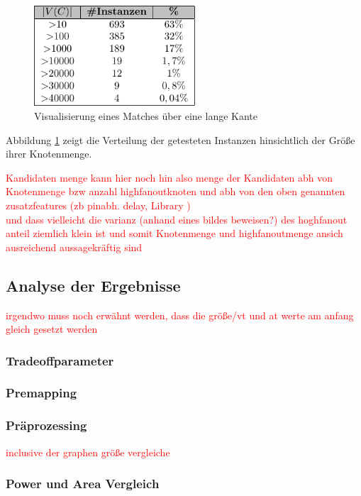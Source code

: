 \documentclass[11pt, a4paper, german]{article}
\begin{document}
  \begin{figure}
		\includegraphics[width = 6cm]{pictures/compiled/instance_sizes_distribution_table}
		\caption{Visualisierung eines Matches über eine lange Kante}
		\label{bild:sizes_table}
	\end{figure}
 Abbildung \ref{bild:sizes_table} zeigt die Verteilung der getesteten Instanzen hinsichtlich der Größe  ihrer Knotenmenge.
 
\textcolor{red}{ Kandidaten menge kann hier noch hin also menge der Kandidaten abh von Knotenmenge bzw anzahl highfanoutknoten  und abh von den oben genannten zusatzfeatures (zb pinabh. delay, Library )  \\  und dass vielleicht die varianz (anhand eines bildes beweisen?) des hoghfanout anteil ziemlich klein ist und somit Knotenmenge und highfanoutmenge ansich ausreichend aussagekräftig sind} 
 
 \subsection{Analyse der Ergebnisse}
 \label{subsec:analyse_der_ergebnisse}
\textcolor{red}{irgendwo muss noch erwähnt werden, dass die größe/vt und at werte am anfang gleich gesetzt werden }
\subsubsection{Tradeoffparameter}

\subsubsection{Premapping}

\subsubsection{Präprozessing}
\textcolor{red}{inclusive der graphen größe vergleiche}

\subsubsection{Power und Area Vergleich}
\end{document}
